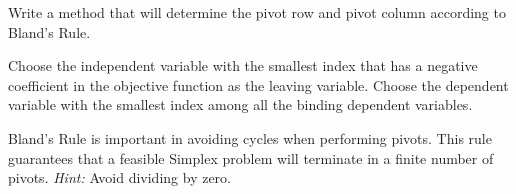 \begin{problem}
Write a method that will determine the pivot row and pivot column according to Bland's Rule.
\begin{definition}
Choose the independent variable with the smallest index that has a negative coefficient in the objective function
as the leaving variable.
Choose the dependent variable with the smallest index among all the binding dependent variables.
\end{definition}

Bland's Rule is important in avoiding cycles when performing pivots.
This rule guarantees that a feasible Simplex problem will terminate in a finite number of pivots. \emph{Hint:} Avoid dividing by zero.
\label{prob:blands}
\end{problem}


